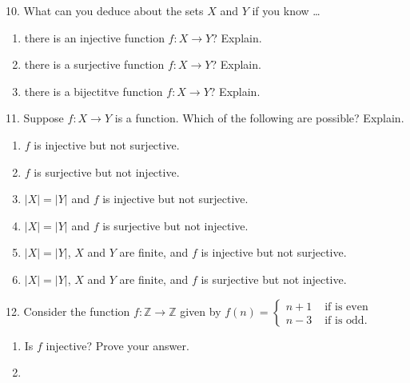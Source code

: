 \documentclass[10pt,]{memoir}
\theoremstyle{plain}
\theoremstyle{definition}
\theoremstyle{definition}
\theoremstyle{definition}
\numberwithin{equation}{chapter}
\def\Z{\mathbb Z}
\newcommand{\amp}{ & }
\begin{document}
\begin{exerciselist}
\item[10.]\hypertarget{exercise-36}{}
            What can you deduce about the sets \(X\) and \(Y\) if you know
            \dots{}
\leavevmode%
\begin{enumerate}[label=(\alph*)]
\item\hypertarget{li-344}{}
                there is an injective function \(f:X \to Y\)? Explain.
\item\hypertarget{li-345}{}
                there is a surjective function \(f:X \to Y\)? Explain.
\item\hypertarget{li-346}{}
                there is a bijectitve function \(f:X \to Y\)? Explain.
\end{enumerate}
\par\smallskip
\item[11.]\hypertarget{exercise-37}{}
            Suppose \(f:X \to Y\) is a function. Which of the following are possible? Explain.
\leavevmode%
\begin{enumerate}[label=(\alph*)]
\item\hypertarget{li-350}{}\(f\) is injective but not surjective.\item\hypertarget{li-351}{}\(f\) is surjective but not injective.\item\hypertarget{li-352}{}\(|X| = |Y|\) and \(f\) is injective but not surjective.\item\hypertarget{li-353}{}\(|X| = |Y|\) and \(f\) is surjective but not injective.\item\hypertarget{li-354}{}\(|X| = |Y|\), \(X\) and \(Y\) are finite, and \(f\) is injective but not surjective.\item\hypertarget{li-355}{}\(|X| = |Y|\), \(X\) and \(Y\) are finite, and \(f\) is surjective but not injective.\end{enumerate}
\par\smallskip
\item[12.]\hypertarget{exercise-38}{}
            Consider the function \(f:\Z \to \Z\) given by \(f(n) = \begin{cases}n+1 \amp  \mbox{ if  is even} \\ n-3 \amp \mbox{ if  is odd} . \end{cases}
            \)
\leavevmode%
\begin{enumerate}[label=(\alph*)]
\item\hypertarget{li-362}{}
                Is \(f\) injective? Prove your answer.
\item\hypertarget{li-363}{}

\end{enumerate}
\end{exerciselist}
\end{document}
